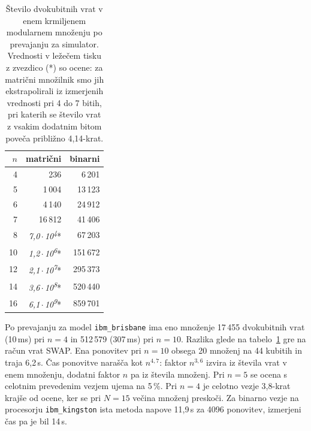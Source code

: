 \begin{table}[htbp]
\caption{Število dvokubitnih vrat v enem krmiljenem modularnem množenju po prevajanju za simulator. Vrednosti v ležečem tisku z zvezdico (*) so ocene: za matrični množilnik smo jih ekstrapolirali iz izmerjenih vrednosti pri 4 do 7 bitih, pri katerih se število vrat z vsakim dodatnim bitom poveča približno 4,14-krat.}
\label{g29:tab:vrata}
\centering
\footnotesize
\setlength{\tabcolsep}{5pt}
\begin{tabular}{rrr}
\toprule
$n$ & matrični & binarni \\
\midrule
4 & 236 & 6\,201 \\
5 & 1\,004 & 13\,123 \\
6 & 4\,140 & 24\,912 \\
7 & 16\,812 & 41\,406 \\
8 & \textit{7,0\,$\cdot$\,10\textsuperscript{4}}* & 67\,203 \\
10 & \textit{1,2\,$\cdot$\,10\textsuperscript{6}}* & 151\,672 \\
12 & \textit{2,1\,$\cdot$\,10\textsuperscript{7}}* & 295\,373 \\
14 & \textit{3,6\,$\cdot$\,10\textsuperscript{8}}* & 520\,440 \\
16 & \textit{6,1\,$\cdot$\,10\textsuperscript{9}}* & 859\,701 \\
\bottomrule
\end{tabular}
\end{table}

 Po prevajanju za model \texttt{ibm\_brisbane} ima eno množenje 17\,455 dvokubitnih vrat (10\,ms) pri $n = 4$ in 512\,579 (307\,ms) pri $n = 10$. Razlika glede na tabelo~\ref{g29:tab:vrata} gre na račun vrat SWAP. Ena ponovitev pri $n = 10$ obsega 20 množenj na 44 kubitih in traja 6,2\,s. Čas ponovitve narašča kot $n^{4{,}7}$: faktor $n^{3{,}6}$ izvira iz števila vrat v enem množenju, dodatni faktor $n$ pa iz števila množenj. Pri $n = 5$ se ocena s celotnim prevedenim vezjem ujema na 5\,\%. Pri $n = 4$ je celotno vezje 3,8-krat krajše od ocene, ker se pri $N = 15$ večina množenj preskoči. Za binarno vezje na procesorju \texttt{ibm\_kingston} ista metoda napove 11,9\,s za 4096 ponovitev, izmerjeni čas pa je bil 14\,s.

